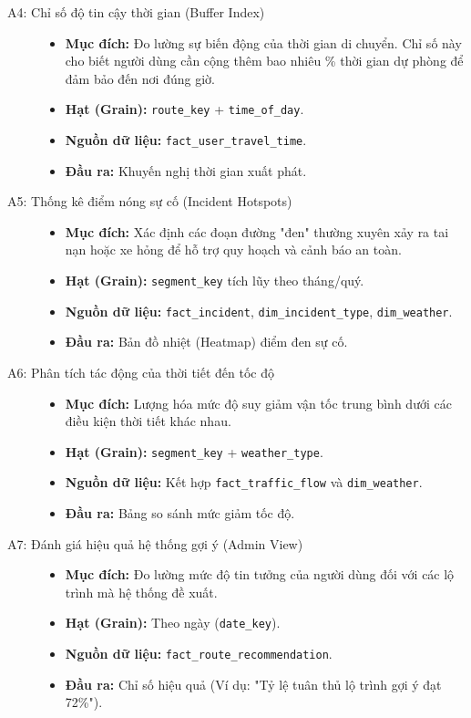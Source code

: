 \begin{description}
    \item[A4: Chỉ số độ tin cậy thời gian (Buffer Index)]\hfill
    \begin{itemize}
        \item \textbf{Mục đích:} Đo lường sự biến động của thời gian di chuyển. Chỉ số này cho biết người dùng cần cộng thêm bao nhiêu \% thời gian dự phòng để đảm bảo đến nơi đúng giờ.
        \item \textbf{Hạt (Grain):} \texttt{route\_key} + \texttt{time\_of\_day}.
        \item \textbf{Nguồn dữ liệu:} \texttt{fact\_user\_travel\_time}.
        \item \textbf{Đầu ra:} Khuyến nghị thời gian xuất phát.
    \end{itemize}

    \item[A5: Thống kê điểm nóng sự cố (Incident Hotspots)]\hfill
    \begin{itemize}
        \item \textbf{Mục đích:} Xác định các đoạn đường "đen" thường xuyên xảy ra tai nạn hoặc xe hỏng để hỗ trợ quy hoạch và cảnh báo an toàn.
        \item \textbf{Hạt (Grain):} \texttt{segment\_key} tích lũy theo tháng/quý.
        \item \textbf{Nguồn dữ liệu:} \texttt{fact\_incident}, \texttt{dim\_incident\_type}, \texttt{dim\_weather}.
        \item \textbf{Đầu ra:} Bản đồ nhiệt (Heatmap) điểm đen sự cố.
    \end{itemize}

    \item[A6: Phân tích tác động của thời tiết đến tốc độ]\hfill
    \begin{itemize}
        \item \textbf{Mục đích:} Lượng hóa mức độ suy giảm vận tốc trung bình dưới các điều kiện thời tiết khác nhau.
        \item \textbf{Hạt (Grain):} \texttt{segment\_key} + \texttt{weather\_type}.
        \item \textbf{Nguồn dữ liệu:} Kết hợp \texttt{fact\_traffic\_flow} và \texttt{dim\_weather}.
        \item \textbf{Đầu ra:} Bảng so sánh mức giảm tốc độ.
    \end{itemize}

    \item[A7: Đánh giá hiệu quả hệ thống gợi ý (Admin View)]\hfill
    \begin{itemize}
        \item \textbf{Mục đích:} Đo lường mức độ tin tưởng của người dùng đối với các lộ trình mà hệ thống đề xuất.
        \item \textbf{Hạt (Grain):} Theo ngày (\texttt{date\_key}).
        \item \textbf{Nguồn dữ liệu:} \texttt{fact\_route\_recommendation}.
        \item \textbf{Đầu ra:} Chỉ số hiệu quả (Ví dụ: "Tỷ lệ tuân thủ lộ trình gợi ý đạt 72\%").
    \end{itemize}


\end{description}
